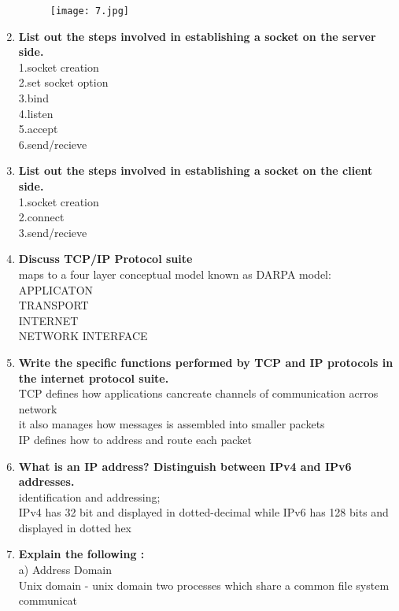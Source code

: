 \documentclass[a4paper,12pt]{article}
\begin{document}
\begin{flushleft}
\begin{enumerate}
\begin{figure}[H]
 \centering
  \texttt{[image: 7.jpg]}
  \label{fig:7}
\end{figure}
\item \textbf{ List out the steps involved in establishing a socket on the server side.}\\
{\color{red}1.socket creation\\
2.set socket option\\
3.bind\\
4.listen\\
5.accept\\
6.send/recieve}\\
\item \textbf{ List out the steps involved in establishing a socket on the client side.}\\
{\color{red}1.socket creation\\
2.connect\\
3.send/recieve }\\
\item \textbf{ Discuss TCP/IP Protocol suite}\\
{\color{red}maps to a four layer conceptual model known as DARPA model: APPLICATON\\
TRANSPORT\\
INTERNET\\
NETWORK INTERFACE}\\
\item \textbf{ Write the specific functions performed by TCP and IP protocols in the internet protocol suite.}\\
{\color{red}TCP defines how applications cancreate channels of communication acrros network\\it also manages how messages is assembled into smaller packets\\
IP defines how to address and route each packet}\\
\item \textbf{ What is an IP address? Distinguish between IPv4 and IPv6 addresses.}\\
{\color{red}identification and addressing;\\IPv4 has 32 bit and displayed in dotted-decimal while IPv6 has 128 bits and displayed in dotted hex}\\
\item \textbf{ Explain the following :}\\
a) Address Domain\\
{\color{red}Unix domain - unix domain two processes which share a common file system communicat\\
}
\end{enumerate}
\end{flushleft}
\end{document}
